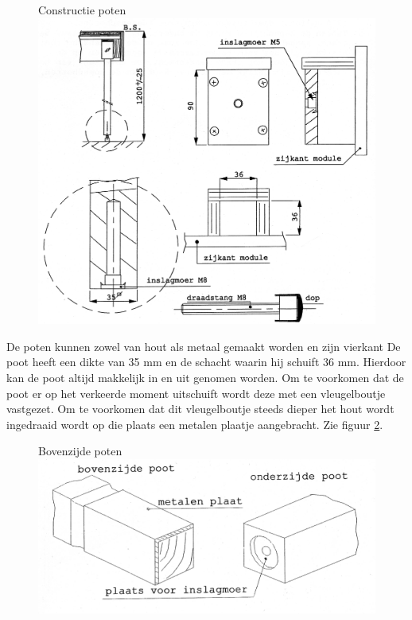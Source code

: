\documentclass[12pt,a4paper]{report}
\begin{document}
\begin{figure}[!ht]
  \captionbox
  {Constructie poten\label{figuur2}}
  {\includegraphics[scale=0.3]{images/rcu_figuur2}}
\end{figure}

De poten kunnen zowel van hout als metaal gemaakt worden en zijn vierkant De poot heeft een dikte van 35 mm en de schacht waarin hij schuift 36 mm. Hierdoor kan de poot altijd makkelijk in en uit genomen worden. Om te voorkomen dat de poot er op het verkeerde moment uitschuift wordt deze met een vleugelboutje vastgezet. Om te voorkomen dat dit vleugelboutje steeds dieper het hout wordt ingedraaid wordt op die plaats een metalen plaatje aangebracht. Zie figuur \ref{figuur3}.

\begin{figure}[!ht]
  \captionbox
  {Bovenzijde poten\label{figuur3}}
  {\includegraphics[scale=0.2]{images/rcu_figuur3}}
\end{figure}
\end{document}
